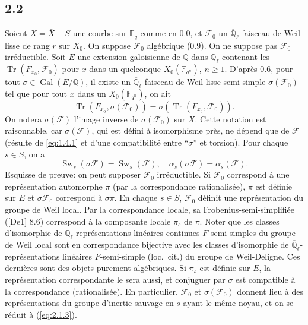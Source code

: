 \documentclass[11pt,a4paper]{article}
\theoremstyle{plain}
\theoremstyle{definition}
\DeclareMathOperator{\Gal}{Gal}
\DeclareMathOperator{\Sw}{Sw}
\DeclareMathOperator{\tr}{Tr}
\begin{document}
\subsection*{2.2}

Soient $X = \bar{X} - S$ une courbe sur $\mathbb{F}_q$ comme en 0.0, et $\mathcal{F}_0$ un $\overline{\mathbb{Q}}_\ell$-faisceau de Weil lisse de rang $r$ sur $X_0$. On suppose $\mathcal{F}_0$ alg\'ebrique (0.9). On ne suppose pas $\mathcal{F}_0$ irr\'eductible. Soit $E$ une extension galoisienne de $\mathbb{Q}$ dans $\overline{\mathbb{Q}}_\ell$ contenant les $\tr(F_{x_0}, \mathcal{F}_0)$ pour $x$ dans un quelconque $X_0(\mathbb{F}_{q^n})$, $n \geq 1$. D'apr\`es 0.6, pour tout $\sigma \in \Gal(E/\mathbb{Q})$, il existe un $\overline{\mathbb{Q}}_\ell$-faisceau de Weil lisse semi-simple $\sigma(\mathcal{F}_0)$ tel que pour tout $x$ dans un $X_0(\mathbb{F}_{q^n})$, on ait
\[
\tr(F_{x_0}, \sigma(\mathcal{F}_0)) = \sigma(\tr(F_{x_0}, \mathcal{F}_0)).
\]
On notera $\sigma(\mathcal{F})$ l'image inverse de $\sigma(\mathcal{F}_0)$ sur $X$. Cette notation est raisonnable, car $\sigma(\mathcal{F})$, qui est d\'efini \`a isomorphisme pr\`es, ne d\'epend que de $\mathcal{F}$ (r\'esulte de \ref{eq:1.4.1} et d'une compatibilit\'e entre ``$\sigma$'' et torsion). Pour chaque $s \in S$, on a
\begin{equation}\label{eq:2.2.1}
\Sw_s(\sigma \mathcal{F}) = \Sw_s(\mathcal{F}), \quad \alpha_s(\sigma \mathcal{F}) = \alpha_s(\mathcal{F}).
\end{equation}
Esquisse de preuve: on peut supposer $\mathcal{F}_0$ irr\'eductible. Si $\mathcal{F}_0$ correspond \`a une repr\'esentation automorphe $\pi$ (par la correspondance rationalis\'ee), $\pi$ est d\'efinie sur $E$ et $\sigma \mathcal{F}_0$ correspond \`a $\sigma \pi$. En chaque $s \in S$, $\mathcal{F}_0$ d\'efinit une repr\'esentation du groupe de Weil local. Par la correspondance locale, sa Frobenius-semi-simplifi\'ee ([De1] 8.6) correspond \`a la composante locale $\pi_s$ de $\pi$. Noter que les classes d'isomorphie de $\overline{\mathbb{Q}}_\ell$-repr\'esentations lin\'eaires continues $F$-semi-simples du groupe de Weil local sont en correspondance bijective avec les classes d'isomorphie de $\overline{\mathbb{Q}}_\ell$-repr\'esentations lin\'eaires $F$-semi-simple (loc.~cit.) du groupe de Weil-Deligne. Ces derni\`eres sont des objets purement alg\'ebriques. Si $\pi_s$ est d\'efinie sur $E$, la repr\'esentation correspondante le sera aussi, et conjuguer par $\sigma$ est compatible \`a la correspondance (rationalis\'ee). En particulier, $\mathcal{F}_0$ et $\sigma(\mathcal{F}_0)$ donnent lieu \`a des repr\'esentations du groupe d'inertie sauvage en $s$ ayant le m\^eme noyau, et on se r\'eduit \`a (\ref{eq:2.1.3}).
\end{document}
